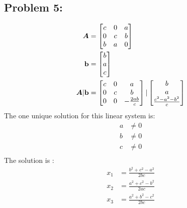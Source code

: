 \documentclass{article}
\begin{document}
\hypertarget{}{}
\subsection*{{Problem 5: }}
\label{}
\begin{align*}
\boldsymbol{A} &= \begin{bmatrix} c & 0 & a \\ 0 & c & b \\ b & a & 0  \end{bmatrix} \\
\boldsymbol{\mathrm{b}} &= \begin{bmatrix} b \\ a \\ c  \end{bmatrix} \\
\boldsymbol{A} | \boldsymbol{\mathrm{b}} &= \begin{bmatrix} c & 0 & a \\ 0 & c & b \\ 0 & 0 & -\frac{2ab}{c}  \end{bmatrix} | \begin{bmatrix}  b \\ a \\  \frac{c^2 - a^2 - b^2}{c} \end{bmatrix}
\end{align*}
The one unique solution for this linear system is:  \begin{align*} a & \neq 0 \\ b & \neq 0 \\ c & \neq 0 \\ \end{align*} 
The solution is : 
\begin{align*} 
x_1 & = \frac{b^2+c^2-a^2}{2bc} \\
x_2 & = \frac{a^2+c^2-b^2}{2ac} \\
x_3 & = \frac{a^2+b^2-c^2}{2bc} \\ 
\end{align*} 


\hypertarget{}{}
\end{document}
